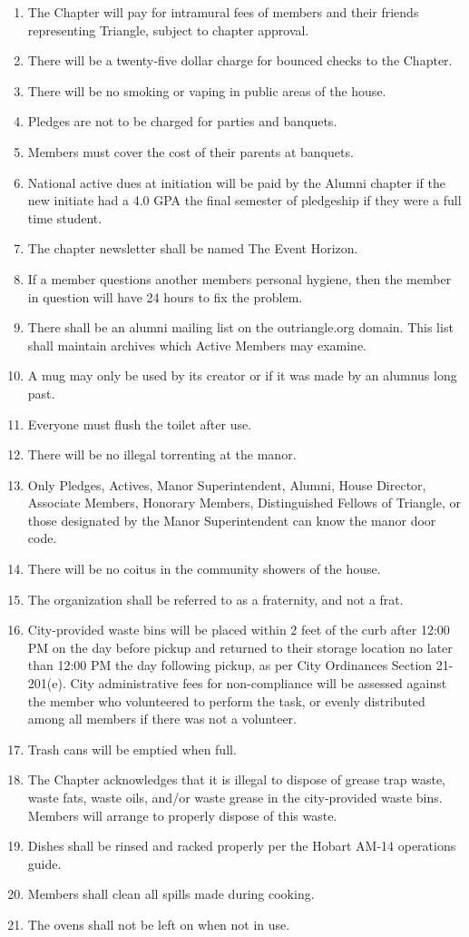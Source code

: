 \begin{enumerate}
\item The Chapter will pay for intramural fees of members and their friends representing Triangle, subject to chapter approval. 
\item There will be a twenty-five dollar charge for bounced checks to the Chapter. 
\item There will be no smoking or vaping in public areas of the house.  
\item Pledges are not to be charged for parties and banquets.  
\item Members must cover the cost of their parents at banquets.  
\item National active dues at initiation will be paid by the Alumni chapter if the new initiate had a 4.0 GPA the final semester of pledgeship if they were a full time student.
\item The chapter newsletter shall be named The Event Horizon. 
\item If a member questions another members personal hygiene, then the member in question will have 24 hours to fix the problem.
\item There shall be an alumni mailing list on the outriangle.org domain. This list shall maintain archives which Active Members may examine.
\item A mug may only be used by its creator or if it was made by an alumnus long past.
\item Everyone must flush the toilet after use.
\item There will be no illegal torrenting at the manor.
\item Only Pledges, Actives, Manor Superintendent, Alumni, House Director, Associate Members, Honorary Members, Distinguished Fellows of Triangle, or those designated by the Manor Superintendent can know the manor door code.
\item There will be no coitus in the community showers of the house.
\item The organization shall be referred to as a fraternity, and not a frat.
\item City-provided waste bins will be placed within 2 feet of the curb after 12:00 PM on the day before pickup and returned to their storage location no later than 12:00 PM the day following pickup, as per City Ordinances Section 21-201(e). City administrative fees for non-compliance will be assessed against the member who volunteered to perform the task, or evenly distributed among all members if there was not a volunteer.
\item Trash cans will be emptied when full.
\item The Chapter acknowledges that it is illegal to dispose of grease trap waste, waste fats, waste oils, and/or waste grease in the city-provided waste bins. Members will arrange to properly dispose of this waste.
\item Dishes shall be rinsed and racked properly per the Hobart AM-14 operations guide.
\item Members shall clean all spills made during cooking.
\item The ovens shall not be left on when not in use.
\end{enumerate}
